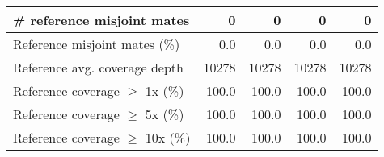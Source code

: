 \documentclass[12pt,a4paper]{article}
\begin{document}
\begin{table}[ht]
\begin{center}
\begin{tabular}{|l*{4}{|r}|}
\# reference misjoint mates & 0 & 0 & 0 & 0 \\ \hline
Reference misjoint mates (\%) & 0.0 & 0.0 & 0.0 & 0.0 \\ \hline
Reference avg. coverage depth & 10278 & 10278 & 10278 & 10278 \\ \hline
Reference coverage $\geq$ 1x (\%) & 100.0 & 100.0 & 100.0 & 100.0 \\ \hline
Reference coverage $\geq$ 5x (\%) & 100.0 & 100.0 & 100.0 & 100.0 \\ \hline
Reference coverage $\geq$ 10x (\%) & 100.0 & 100.0 & 100.0 & 100.0 \\ \hline
\end{tabular}
\end{center}
\end{table}
\end{document}
